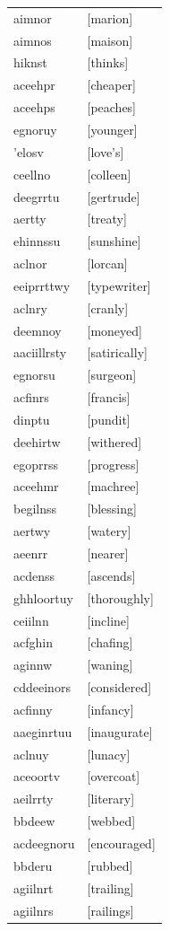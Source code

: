\documentclass{article}
\begin{document}
\begin{tabular}{ll}
aimnor & [marion] \\
aimnos & [maison] \\
hiknst & [thinks] \\
aceehpr & [cheaper] \\
aceehps & [peaches] \\
egnoruy & [younger] \\
'elosv & [love's] \\
ceellno & [colleen] \\
deegrrtu & [gertrude] \\
aertty & [treaty] \\
ehinnssu & [sunshine] \\
aclnor & [lorcan] \\
eeiprrttwy & [typewriter] \\
aclnry & [cranly] \\
deemnoy & [moneyed] \\
aaciillrsty & [satirically] \\
egnorsu & [surgeon] \\
acfinrs & [francis] \\
dinptu & [pundit] \\
deehirtw & [withered] \\
egoprrss & [progress] \\
aceehmr & [machree] \\
begilnss & [blessing] \\
aertwy & [watery] \\
aeenrr & [nearer] \\
acdenss & [ascends] \\
ghhloortuy & [thoroughly] \\
ceiilnn & [incline] \\
acfghin & [chafing] \\
aginnw & [waning] \\
cddeeinors & [considered] \\
acfinny & [infancy] \\
aaeginrtuu & [inaugurate] \\
aclnuy & [lunacy] \\
aceoortv & [overcoat] \\
aeilrrty & [literary] \\
bbdeew & [webbed] \\
acdeegnoru & [encouraged] \\
bbderu & [rubbed] \\
agiilnrt & [trailing] \\
agiilnrs & [railings] \\

\end{tabular}
\end{document}
